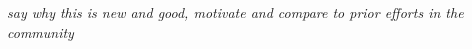 \documentclass[12pt]{iopart}
\begin{document}


\emph{say why this is new and good, motivate and compare to prior efforts in the community}

%
%
%
%
%

\end{document}
